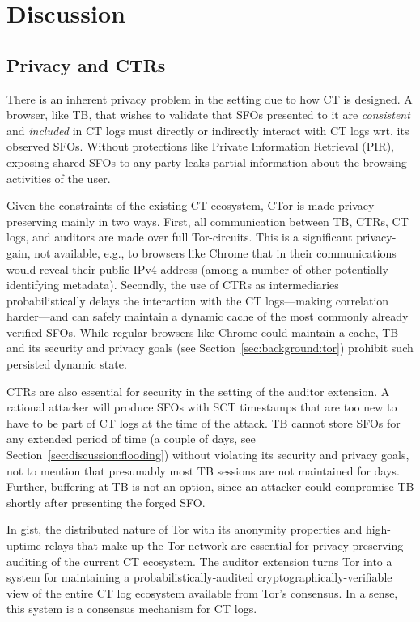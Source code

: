 \section{Discussion} \label{sec:discussion}

\subsection{Privacy and CTRs}
There is an inherent privacy problem in the setting due to how CT is designed. A
browser, like TB, that wishes to validate that SFOs presented to it are
\emph{consistent} and \emph{included} in CT logs must directly or indirectly
interact with CT logs wrt. its observed SFOs. Without protections like Private
Information Retrieval (PIR), exposing shared SFOs to any party leaks partial
information about the browsing activities of the user.

Given the constraints of the existing CT ecosystem, CTor is made
privacy-preserving mainly in two ways. First, all communication between TB,
CTRs, CT logs, and auditors are made over full Tor-circuits. This is a
significant privacy-gain, not available, e.g., to browsers like Chrome that in
their communications would reveal their public IPv4-address (among a number of
other potentially identifying metadata). Secondly, the use of CTRs as
intermediaries probabilistically delays the interaction with the CT
logs---making correlation harder---and can safely maintain a dynamic cache of
the most commonly already verified SFOs. While regular browsers like Chrome
could maintain a cache, TB and its security and privacy goals (see
Section~\ref{sec:background:tor}) prohibit such persisted dynamic state.

CTRs are also essential for security in the setting of the auditor extension. A
rational attacker will produce SFOs with SCT timestamps that are too new to have
to be part of CT logs at the time of the attack. TB cannot store SFOs for any
extended period of time (a couple of days, see
Section~\ref{sec:discussion:flooding}) without violating its security and
privacy goals, not to mention that presumably most TB sessions are not
maintained for days. Further, buffering at TB is not an option, since an
attacker could compromise TB shortly after presenting the forged SFO.

In gist, the distributed nature of Tor with its anonymity properties and
high-uptime relays that make up the Tor network are essential for
privacy-preserving auditing of the current CT ecosystem. The auditor extension
turns Tor into a system for maintaining a probabilistically-audited
cryptographically-verifiable view of the entire CT log ecosystem available from
Tor’s consensus. In a sense, this system is a consensus mechanism for CT logs.

